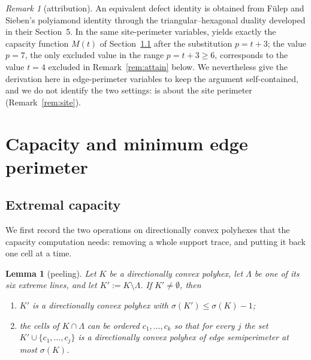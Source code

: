 \documentclass[11pt]{article}
\theoremstyle{plain}
\newtheorem{lemma}[theorem]{Lemma}
\theoremstyle{definition}
\theoremstyle{remark}
\newtheorem{remark}[theorem]{Remark}
\newcommand{\sm}{\setminus}
\begin{document}
\begin{remark}[attribution]\label{rem:fs}
An equivalent defect identity is obtained from F\"ulep and Sieben's polyiamond identity
\cite[Lemma~3.3]{FulepSieben2010} through the triangular--hexagonal duality developed in their Section~5.
In the same site-perimeter variables, \cite[Proposition~5.10]{FulepSieben2010} yields exactly the capacity
function \(M(t)\) of Section~\ref{sec:2.6} after the substitution \(p=t+3\); the value
\(p=7\), the only excluded value in the range \(p=t+3\geq6\), corresponds to the value \(t=4\) excluded in
Remark~\ref{rem:attain} below. We nevertheless give the derivation here in edge-perimeter
variables to keep the argument self-contained, and we do not identify the two settings:
\cite{FulepSieben2010} is about the site perimeter (Remark~\ref{rem:site}).
\end{remark}

\section{Capacity and minimum edge perimeter}\label{sec:capacity}

\subsection{Extremal capacity}\label{sec:2.6}

We first record the two operations on directionally convex polyhexes that the capacity
computation needs: removing a whole support trace, and putting it back one cell at a time.

\begin{lemma}[peeling]\label{lem:peel}
Let \(K\) be a directionally convex polyhex, let \(\Lambda\) be one of its six extreme
lines, and let \(K':=K\sm\Lambda\). If \(K'\neq\emptyset\), then
\begin{enumerate}
\item[(i)] \(K'\) is a directionally convex polyhex with \(\sigma(K')\le\sigma(K)-1\);
\item[(ii)] the cells of \(K\cap\Lambda\) can be ordered \(c_{1},\dots,c_{k}\) so that for
every \(j\) the set \(K'\cup\{c_{1},\dots,c_{j}\}\) is a directionally convex polyhex of
edge semiperimeter at most \(\sigma(K)\).
\end{enumerate}
\end{lemma}
\end{document}
